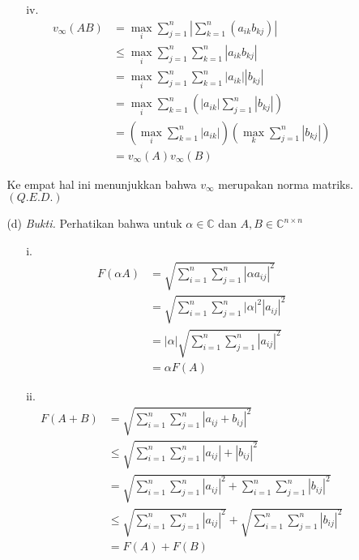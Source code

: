 \documentclass[11pt,a4paper]{article}
\newcommand{\ds}{\displaystyle}
\theoremstyle{plain}
\theoremstyle{definition}
\theoremstyle{remark}
\begin{document}
\begin{enumerate}
\begin{enumerate}
\begin{enumerate}
\begin{enumerate}
			\item[iv.] 
			\begin{align*}
			v_{\infty}(AB) &= \ds \max_{i} \sum_{j=1}^{n} \left| \sum_{k=1}^{n} (a_{ik}b_{kj})\right| \\
			&\leq \ds \max_{i} \sum_{j=1}^{n} \sum_{k=1}^{n} \left| a_{ik}b_{kj}\right| \\
			&= \ds \max_{i} \sum_{j=1}^{n} \sum_{k=1}^{n} \left| a_{ik} \right| \left|b_{kj}\right| \\
			&= \ds \max_{i} \sum_{k=1}^{n} \left( \left|a_{ik}\right| \sum_{j=1}^{n} \left| b_{kj} \right| \right) \\
			&= \ds \left( \max_{i} \sum_{k=1}^{n} \left| a_{ik}\right|\right) \left( \max_{k} \sum_{j=1}^{n} \left| b_{kj} \right| \right) \\
			&= v_{\infty}(A)v_{\infty}(B)
			\end{align*}
		\end{enumerate}
		Ke empat hal ini menunjukkan bahwa $v_{\infty}$ merupakan norma matriks. $(Q.E.D.)$
		\item[(d)] \textit{Bukti.} Perhatikan bahwa untuk $\alpha\in \mathbb{C}$ dan $A,B\in \mathbb{C}^{n\times n}$ 
		\begin{enumerate}
			\item[i.] 
			\begin{align*}
			F(\alpha A) &=\ds \sqrt{\sum_{i=1}^{n} \sum_{j=1}^{n} \left| \alpha a_{ij}\right|^{2}} \\
			&=\ds \sqrt{\sum_{i=1}^{n} \sum_{j=1}^{n} \left|\alpha\right|^{2} \left| a_{ij}\right|^{2}} \\
			&=\ds \left|\alpha \right| \sqrt{\sum_{i=1}^{n} \sum_{j=1}^{n} \left| a_{ij}\right|^{2}} \\
			&= \alpha F(A)
			\end{align*}
			\item[ii.] 
			\begin{align*}
			F(A+B) &=\ds \sqrt{\sum_{i=1}^{n} \sum_{j=1}^{n} \left| a_{ij}+b_{ij}\right|^{2}} \\
			&\leq \ds \sqrt{\sum_{i=1}^{n} \sum_{j=1}^{n} \left| a_{ij} \right| +\left|b_{ij}\right|^{2}} \\
			&=\ds \sqrt{\sum_{i=1}^{n} \sum_{j=1}^{n} \left| a_{ij}\right|^{2}+ \sum_{i=1}^{n} \sum_{j=1}^{n} \left| b_{ij}\right|^{2}} \\
			&\leq \ds \sqrt{\sum_{i=1}^{n} \sum_{j=1}^{n} \left| a_{ij}\right|^{2}}+\sqrt{ \sum_{i=1}^{n} \sum_{j=1}^{n} \left| b_{ij}\right|^{2}} \\
			&=F(A)+F(B)

\end{align*}
\end{enumerate}
\end{enumerate}
\end{enumerate}
\end{enumerate}
\end{document}
